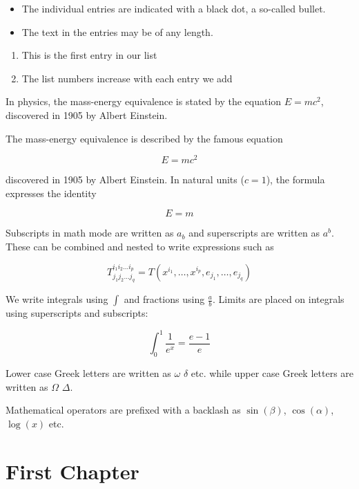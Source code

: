 \documentclass{report}
\begin{document}
\begin{itemize}
    \item The individual entries are indicated with a black dot, a so-called bullet.
    \item The text in the entries may be of any length.
\end{itemize}

\begin{enumerate}
    \item This is the first entry in our list
    \item The list numbers increase with each entry we add
\end{enumerate}

In physics, the mass-energy equivalence is stated by the equation $E=mc^2$, discovered in 1905 by Albert Einstein.

The mass-energy equivalence is described by the famous equation

\[E=mc^2\]

discovered in 1905 by Albert Einstein.
In natural units ($c = 1$), the formula expresses the identity

\begin{equation}
    E=m
\end{equation}

Subscripts in math mode are written as $a_b$ and superscripts are written as $a^b$. These can be combined and nested to write expressions such as

\begin{equation}
    T^{i_1 i_2 \dots i_p}_{j_1 j_2 \dots j_q} =
    T(x^{i_1}, \dots, x^{i_p}, e_{j_1}, \dots, e_{j_q})
\end{equation}

We write integrals using $\int$ and fractions using $\frac{a}{b}$. Limits are placed on integrals using superscripts and subscripts:

\begin{equation}
    \int_0^1 \frac{1}{e^x} = \frac{e-1}{e}
\end{equation}

Lower case Greek letters are written as $\omega$ $\delta$ etc. while upper case Greek letters are written as $\Omega$ $\Delta$.

Mathematical operators are prefixed with a backlash as $\sin(\beta)$, $\cos(\alpha)$, $\log(x)$ etc.

\tableofcontents

\chapter{First Chapter}
\end{document}
